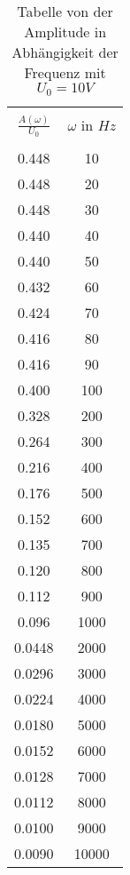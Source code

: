 \begin{table}[H]
  \centering
  \caption{Tabelle von der Amplitude in Abhängigkeit der Frequenz mit $U_0 = 10V$}
    \begin{tabular}{c c}
      \toprule \\
      $\frac{A(\omega)}{U_\text{0}}$ & $\omega \,\, \text{in} \,\, Hz$ \\
      \midrule \\
      0.448 & 10\\
      0.448 & 20\\
      0.448 & 30\\
      0.440 & 40\\
      0.440 & 50\\
      0.432 & 60\\
      0.424 & 70\\
      0.416 & 80\\
      0.416 & 90\\
      0.400 & 100\\
      0.328 & 200\\
      0.264 & 300\\
      0.216 & 400\\
      0.176 & 500\\
      0.152 & 600\\
      0.135 & 700\\
      0.120 & 800\\
      0.112 & 900\\
      0.096 & 1000\\
      0.0448& 2000\\
      0.0296& 3000\\
      0.0224& 4000\\
      0.0180& 5000\\
      0.0152& 6000\\
      0.0128& 7000\\
      0.0112& 8000\\
      0.0100& 9000\\
      0.0090& 10000\\
      \bottomrule
    \end{tabular}
    \label{tab:2}
  \end{table}
